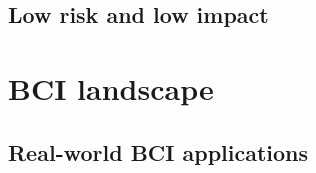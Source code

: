 \subsection{Low risk and low impact}
\label{chapter2-low-risk-and-low-impact}













\section{BCI landscape}
\label{chapter2-research-landscape}


\subsection{Real-world BCI applications}
\label{chapter2-real-world-bci-applications}

